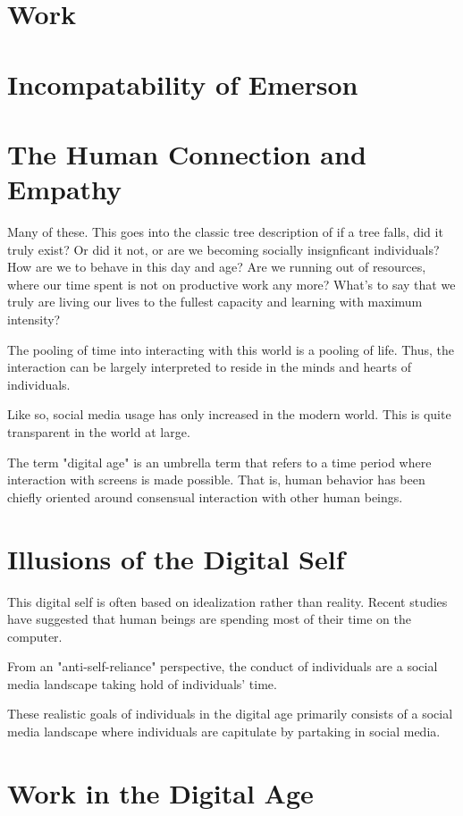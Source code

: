 \documentclass[12pt,letterpaper]{article}
\begin{document}
\section{Work}
\section{Incompatability of Emerson}

\section{The Human Connection and Empathy}

Many of these.  This goes into the classic tree description of if a tree falls, did it truly exist?  Or did it not, or are we becoming socially insignficant individuals?  How are we to behave in this day and age?  Are we running out of resources, where our time spent is not on productive work any more?  What's to say that we truly are living our lives to the fullest capacity and learning with maximum intensity?

The pooling of time into interacting with this world is a pooling of life.  Thus, the interaction can be largely interpreted to reside in the minds and hearts of individuals.

Like so, social media usage has only increased in the modern world.  This is quite transparent in the world at large.

The term "digital
age" is an umbrella term that refers to a time period
where interaction with screens is made possible.  That is,
human behavior has been chiefly oriented around consensual
interaction with other human beings.

\section{Illusions of the Digital Self}
This
digital self is often based on idealization rather than
reality.  Recent studies have suggested that
human beings are spending most of their time on the
computer.

From an "anti-self-reliance" perspective, the conduct of individuals are a
social media landscape taking hold of individuals' time.

These realistic goals of individuals in the
digital age primarily consists of a social media landscape
where individuals are capitulate by partaking in social
media.  


\section{Work in the Digital Age}
\end{document}
